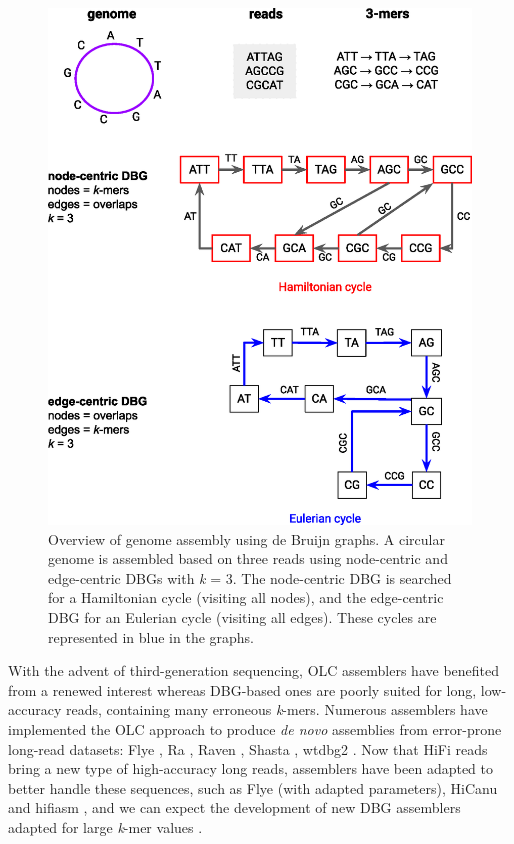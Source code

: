 \begin{figure}
    \centering
    \includegraphics[width=\textwidth]{fig/review_de_bruijn_graphs.eps}
    \caption{Overview of genome assembly using de Bruijn graphs. A circular genome is assembled based on three reads using node-centric and edge-centric DBGs with \textit{k} = 3. The node-centric DBG is searched for a Hamiltonian cycle (visiting all nodes), and the edge-centric DBG for an Eulerian cycle (visiting all edges). These cycles are represented in blue in the graphs.}
    \label{fig:dbg}
\end{figure}

With the advent of third-generation sequencing, OLC assemblers have benefited from a renewed interest whereas DBG-based ones are poorly suited for long, low-accuracy reads, containing many erroneous \textit{k}-mers. Numerous assemblers have implemented the OLC approach to produce \textit{de novo} assemblies from error-prone long-read datasets: Flye \cite{flye}, Ra \cite{ra}, Raven \cite{raven}, Shasta \cite{shasta}, wtdbg2 \cite{wtdbg2}. Now that HiFi reads bring a new type of high-accuracy long reads, assemblers have been adapted to better handle these sequences, such as Flye (with adapted parameters), HiCanu \cite{hicanu} and hifiasm \cite{hifiasm}, and we can expect the development of new DBG assemblers adapted for large \textit{k}-mer values \cite{bankevich2020, mdbg}. \\

